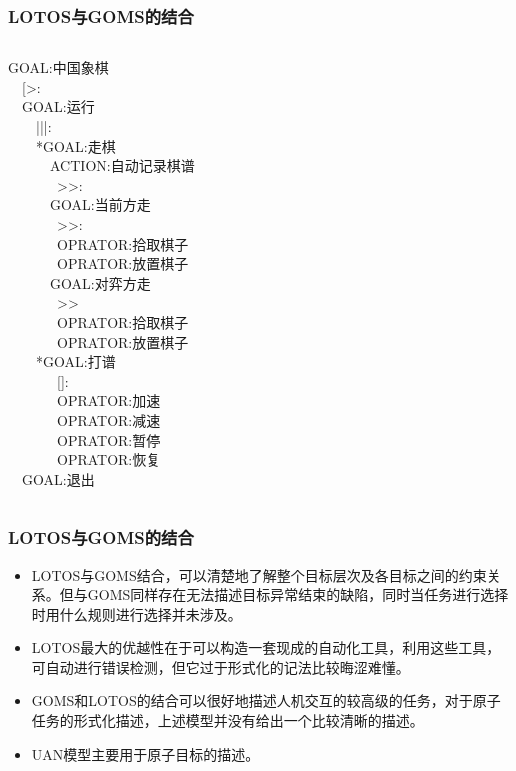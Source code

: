 \documentclass{beamer}
\begin{document}
\begin{frame}
	\frametitle{LOTOS与GOMS的结合}
	\begin{columns}
	GOAL:中国象棋\\
	~~[>:\\
	~~GOAL:运行\\
	~~~~|||:\\
	~~~~*GOAL:走棋\\
	~~~~~~ACTION:自动记录棋谱\\
	~~~~~~~>>:\\
	~~~~~~GOAL:当前方走\\
	~~~~~~~>>:\\
	~~~~~~~OPRATOR:拾取棋子\\
	~~~~~~~OPRATOR:放置棋子\\
	~~~~~~GOAL:对弈方走\\
	~~~~~~~>>\\
	~~~~~~~OPRATOR:拾取棋子\\
	~~~~~~~OPRATOR:放置棋子\\
	~~~~*GOAL:打谱\\
	~~~~~~~[]:\\
	~~~~~~~OPRATOR:加速\\
	~~~~~~~OPRATOR:减速\\
	~~~~~~~OPRATOR:暂停\\
	~~~~~~~OPRATOR:恢复\\
	~~GOAL:退出\\
	\end{columns}
\end{frame}

\begin{frame}
	\frametitle{LOTOS与GOMS的结合}
	\beamertemplatetransparentcovereddynamicmedium
	\begin{itemize}[<+->]
		\item LOTOS与GOMS结合，可以清楚地了解整个目标层次及各目标之间的约束关系。但与GOMS同样存在无法描述目标异常结束的缺陷，同时当任务进行选择时用什么规则进行选择并未涉及。
		\item LOTOS最大的优越性在于可以构造一套现成的自动化工具，利用这些工具，可自动进行错误检测，但它过于形式化的记法比较晦涩难懂。
		\item GOMS和LOTOS的结合可以很好地描述人机交互的较高级的任务，对于原子任务的形式化描述，上述模型并没有给出一个比较清晰的描述。
		\item UAN模型主要用于原子目标的描述。
	\end{itemize}
\end{frame}
\end{document}
